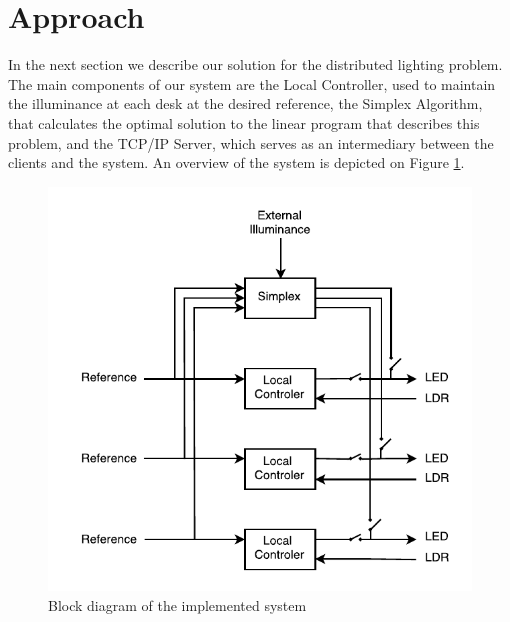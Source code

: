 \section{Approach}

In the next section we describe our solution for the distributed lighting problem. The main components of our system are the Local Controller, used to maintain the illuminance at each desk at the desired reference, the Simplex Algorithm, that calculates the optimal solution to the linear program that describes this problem, and the TCP/IP Server, which serves as an intermediary between the clients and the system. An overview of the system is depicted on Figure \ref{fig:global_system}.

\begin{figure}[!ht]
    \centering
        \includegraphics[scale=0.8]{img/GlobalSystem}
    \caption{Block diagram of the implemented system}\label{fig:global_system}
\end{figure}







